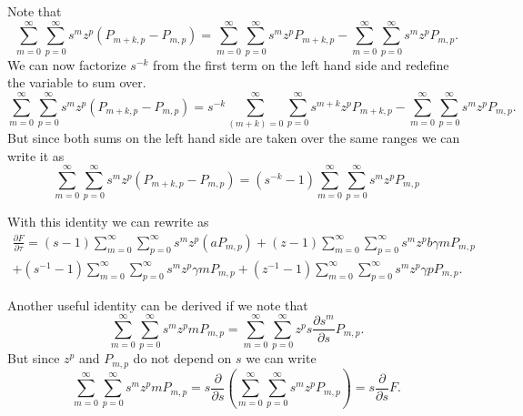 Note that
\begin{equation}
\sum_{m=0}^{\infty} \sum_{p=0}^{\infty} s^m z^p \left( P_{m+k, p} - P_{m, p}
\right) =
\sum_{m=0}^{\infty} \sum_{p=0}^{\infty} s^m z^p P_{m+k, p}
- \sum_{m=0}^{\infty} \sum_{p=0}^{\infty} s^m z^p P_{m, p}.
\end{equation}
We can now factorize $s^{-k}$ from the first term on the left hand side and
redefine the variable to sum over.
\begin{equation}
\sum_{m=0}^{\infty} \sum_{p=0}^{\infty} s^m z^p \left( P_{m+k, p} - P_{m, p}
\right) =
s^{-k} \sum_{(m+k)=0}^{\infty} \sum_{p=0}^{\infty} s^{m+k} z^p P_{m+k, p}
- \sum_{m=0}^{\infty} \sum_{p=0}^{\infty} s^m z^p P_{m, p}.
\end{equation}
But since both sums on the left hand side are taken over the same ranges we can
write it as
\begin{equation}
\sum_{m=0}^{\infty} \sum_{p=0}^{\infty} s^m z^p \left( P_{m+k, p} - P_{m, p}
\right) =
\left( s^{-k} - 1 \right) \sum_{m=0}^{\infty} \sum_{p=0}^{\infty} s^m z^p P_{m,
p}
\end{equation}

With this identity we can rewrite  as
\begin{equation}
\begin{aligned}
\frac{\partial F}{\partial \tau} =
(s - 1) \sum_{m=0}^{\infty} \sum_{p=0}^{\infty} s^m z^p \left( a P_{m,p} \right)
+ (z - 1) \sum_{m=0}^{\infty} \sum_{p=0}^{\infty} s^m z^p b \gamma m P_{m,p}
\\
+ \left( s^{-1} - 1 \right) \sum_{m=0}^{\infty} \sum_{p=0}^{\infty} s^m z^p
\gamma m P_{m,p}
+ \left( z^{-1} - 1 \right) \sum_{m=0}^{\infty} \sum_{p=0}^{\infty} s^m z^p
\gamma p P_{m,p}.
\end{aligned}
\label{eq_dF_dtau_identity}
\end{equation}

Another useful identity can be derived if we note that
\begin{equation}
\sum_{m=0}^{\infty} \sum_{p=0}^{\infty} s^m z^p m P_{m, p} =
\sum_{m=0}^{\infty} \sum_{p=0}^{\infty} z^p s \frac{\partial s^m}{\partial s}
P_{m, p}.
\end{equation}
But since $z^p$ and $P_{m, p}$ do not depend on $s$ we can write
\begin{equation}
\sum_{m=0}^{\infty} \sum_{p=0}^{\infty} s^m z^p m P_{m, p} =
s \frac{\partial}{\partial s}\left( \sum_{m=0}^{\infty} \sum_{p=0}^{\infty} s^m z^p P_{m, p} \right) =
s \frac{\partial}{\partial s}F.
\end{equation}

